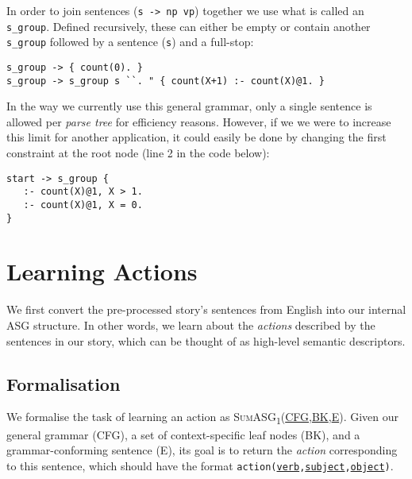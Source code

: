 In order to join sentences (\texttt{s -> np vp}) together we use what is called an \texttt{s\_group}. Defined recursively, these can either be empty or contain another \texttt{s\_group} followed by a sentence (\texttt{s}) and a full-stop:

\begin{displayquote}
\begin{lstlisting}
s_group -> { count(0). }
s_group -> s_group s ``. " { count(X+1) :- count(X)@1. }
\end{lstlisting}
\end{displayquote}

\noindent
In the way we currently use this general grammar, only a single sentence is allowed per \textit{parse tree} for efficiency reasons. However, if we we were to increase this limit for another application, it could easily be done by changing the first constraint at the root node (line 2 in the code below):

\begin{displayquote}
\begin{lstlisting}
start -> s_group {
   :- count(X)@1, X > 1.
   :- count(X)@1, X = 0.
}
\end{lstlisting}
\end{displayquote}

\section{Learning Actions}
\label{sec:learn_actions}

We first convert the pre-processed story's sentences from English into our internal ASG structure. In other words, we learn about the \textit{actions} described by the sentences in our story, which can be thought of as high-level semantic descriptors.

\subsection{Formalisation}

We formalise the task of learning an action as \textsc{SumASG\textsubscript{1}(\underline{CFG},\underline{BK},\underline{E})}. Given our general grammar (\textsc{CFG}), a set of context-specific leaf nodes (\textsc{BK}), and a grammar-conforming sentence (\textsc{E}), its goal is to return the \textit{action} corresponding to this sentence, which should have the format \texttt{action(\underline{verb},\underline{subject},\underline{object})}.

